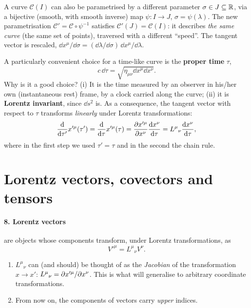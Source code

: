 \begin{remarkbox}[Reparametrisations]
A curve $\mathcal C(I)$ can also be parametrised by a different parameter $\sigma\in J\subseteq\mathbb{R}$, via a bijective (smooth, with smooth inverse) map $\psi:I\to J$, $\sigma=\psi(\lambda)$. The new parametrisation $\mathcal C'=\mathcal C\circ\psi^{-1}$ satisfies $\mathcal C'(J)=\mathcal C(I)$: it describes \emph{the same curve} (the same set of points), traversed with a different ``speed''. The tangent vector is rescaled, $\dd x^\mu/\dd\sigma=(\dd\lambda/\dd\sigma)\,\dd x^\mu/\dd\lambda$.
\end{remarkbox}

A particularly convenient choice for a time-like curve is the \textbf{proper time} $\tau$,
\begin{equation}
  c\,\dd\tau=\sqrt{\eta_{\mu\nu}\dd x^\mu\dd x^\nu}.
\end{equation}
Why is it a good choice? (i) It is the time measured by an observer in his/her own (instantaneous rest) frame, by a clock carried along the curve; (ii) it is \textbf{Lorentz invariant}, since $\dd s^2$ is. As a consequence, the tangent vector with respect to $\tau$ transforms \emph{linearly} under Lorentz transformations:
\begin{equation}
  \frac{\mathrm{d}}{\mathrm{d}\tau'}x'^\mu(\tau')=\frac{\mathrm{d}}{\mathrm{d}\tau}x'^\mu(\tau)
  =\frac{\partial x'^\mu}{\partial x^\nu}\frac{\mathrm{d} x^\nu}{\mathrm{d}\tau}=L^\mu{}_\nu\frac{\mathrm{d} x^\nu}{\mathrm{d}\tau},
\end{equation}
where in the first step we used $\tau'=\tau$ and in the second the chain rule.

\section{Lorentz vectors, covectors and tensors}

\paragraph{8. Lorentz vectors} are objects whose components transform, under Lorentz transformations, as
\begin{equation}
  V'^\mu=L^\mu{}_\nu V^\nu .
\end{equation}
\begin{remarkbox}[Remarks]
\begin{enumerate}[nosep]
\item $L^\mu{}_\nu$ can (and should) be thought of as the \emph{Jacobian} of the transformation $x\to x'$: $L^\mu{}_\nu=\partial x'^\mu/\partial x^\nu$. This is what will generalise to arbitrary coordinate transformations.
\item From now on, the components of vectors carry \emph{upper} indices.
\end{enumerate}
\end{remarkbox}

